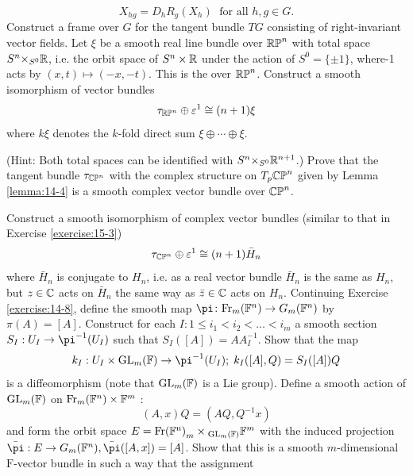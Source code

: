 \begin{enumerate}[\theexercise.1]
    \[
      {X}_{hg} = {D}_{h}{R}_{g}( {X}_{h}) \;\text{ for all }h,g \in  G.
    \]
    Construct a frame over $G$ for the tangent bundle ${TG}$ consisting of right-invariant vector fields.
  \NewItem Let $\xi$ be a smooth real line bundle over ${\mathbb{{RP}}}^{n}$ with total space ${S}^{n}{ \times  }_{{S}^{0}}\mathbb{R}$, i.e. the orbit space of ${S}^{n} \times  \mathbb{R}$ under the action of ${S}^{0} = \{  \pm  1\}$, where-1 acts by $( {x,t})  \mapsto  ( {-x,- t})$. This is the  over ${\mathbb{{RP}}}^{n}$. Construct a smooth isomorphism of vector bundles
    \[
      {\tau }_{\mathbb{RP}^n} \oplus  {\varepsilon }^{1} \cong  ( {n + 1}) \xi
    \]
    where ${k\xi }$ denotes the $k$-fold direct sum $\xi  \oplus  \cdots  \oplus  \xi$. \par(Hint: Both total spaces can be identified with ${S}^{n}{ \times  }_{{S}^{0}}{\mathbb{R}}^{n + 1}$.)
  \NewItem Prove that the tangent bundle ${\tau }_{{\mathbb{{CP}}}^{n}}$ with the complex structure on ${T}_{p}{\mathbb{{CP}}}^{n}$ given by Lemma \ref{lemma:14-4} is a smooth complex vector bundle over ${\mathbb{{CP}}}^{n}$.
  \par Construct a smooth isomorphism of complex vector bundles (similar to that in Exercise \ref{exercise:15-3})
    \[
      {\tau }_{{\mathbb{{CP}}}^{n}} \oplus  {\varepsilon }^{1} \cong  ( {n + 1}) {\bar{H}}_{n}
    \]
    where ${\bar{H}}_{n}$ is conjugate to ${H}_{n}$, i.e. as a real vector bundle ${\bar{H}}_{n}$ is the same as ${H}_{n}$, but $z \in  \mathbb{C}$ acts on ${\bar{H}}_{n}$ the same way as $\bar{z} \in  \mathbb{C}$ acts on ${H}_{n}$.
  \NewItem Continuing Exercise \ref{exercise:14-8}, define the smooth map $\pi\colon  {\R{Fr}}_{m}( {\B{F}}^{n})  \ra  {G}_{m}( {\B{F}}^{n})$ by $\pi ( A)  = [  A]$.
    Construct for each $I : 1 \leq  {i}_{1} < {i}_{2} < \ldots  < {i}_{m}$ a smooth section ${S}_{I} : {U}_{I} \ra  {\pi }^{-1}( {U}_{I})$ such that ${S}_{I}( [  A]  )  = A{A}_{I}^{-1}$. Show that the map
    \[
      {k}_{I} : {U}_{I} \times  {\mathrm{{GL}}}_{m}( \B{F})  \ra  {\pi }^{-1}( {U}_{I});\;{k}_{I}( {[  A] ,Q})  = {S}_{I}( [  A]  ) Q
    \]
    is a diffeomorphism (note that ${\mathrm{{GL}}}_{m}( \mathbb{F})$ is a Lie group). Define a smooth action of ${\mathrm{{GL}}}_{m}( \mathbb{F})$ on ${\mathrm{Fr}}_{m}( {\mathbb{F}}^{n})  \times  {\ensuremath{\mathbb{F}}}^{m}$ :
    \[
      ( {A,x}) Q = ( {{AQ},{Q}^{-1}x})
    \]
    and form the orbit space $E = \mathrm{Fr}{( {\mathbb{F}}^{\mathrm{n}}) }_{m} \times  {}_{{\mathrm{{GL}}}_{m}( \mathbb{F}) }{\mathbb{F}}^{m}$ with the induced projection $\bar{\pi } : E \ra  {G}_{m}( {\B{F}}^{n}),\bar{\pi }( [  {A,x}]  )  = [  A]$. Show that this is a smooth $m$-dimensional $\mathrm{F}$-vector bundle in such a way that the assignment

\end{enumerate}
